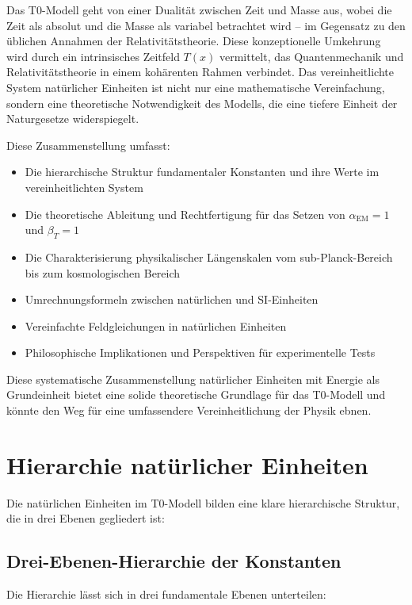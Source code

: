 \documentclass[12pt,a4paper]{article}
\newcommand{\Tfield}{T(x)}
\begin{document}
	Das T0-Modell geht von einer Dualität zwischen Zeit und Masse aus, wobei die Zeit als absolut und die Masse als variabel betrachtet wird – im Gegensatz zu den üblichen Annahmen der Relativitätstheorie. Diese konzeptionelle Umkehrung wird durch ein intrinsisches Zeitfeld $\Tfield$ vermittelt, das Quantenmechanik und Relativitätstheorie in einem kohärenten Rahmen verbindet. Das vereinheitlichte System natürlicher Einheiten ist nicht nur eine mathematische Vereinfachung, sondern eine theoretische Notwendigkeit des Modells, die eine tiefere Einheit der Naturgesetze widerspiegelt.
	
	Diese Zusammenstellung umfasst:
	\begin{itemize}
		\item Die hierarchische Struktur fundamentaler Konstanten und ihre Werte im vereinheitlichten System
		\item Die theoretische Ableitung und Rechtfertigung für das Setzen von $\alpha_{\text{EM}} = 1$ und $\beta_T = 1$
		\item Die Charakterisierung physikalischer Längenskalen vom sub-Planck-Bereich bis zum kosmologischen Bereich
		\item Umrechnungsformeln zwischen natürlichen und SI-Einheiten
		\item Vereinfachte Feldgleichungen in natürlichen Einheiten
		\item Philosophische Implikationen und Perspektiven für experimentelle Tests
	\end{itemize}
	
	Diese systematische Zusammenstellung natürlicher Einheiten mit Energie als Grundeinheit bietet eine solide theoretische Grundlage für das T0-Modell und könnte den Weg für eine umfassendere Vereinheitlichung der Physik ebnen.
	
	\section{Hierarchie natürlicher Einheiten}
	
	Die natürlichen Einheiten im T0-Modell bilden eine klare hierarchische Struktur, die in drei Ebenen gegliedert ist:
	
	\subsection{Drei-Ebenen-Hierarchie der Konstanten}
	
	Die Hierarchie lässt sich in drei fundamentale Ebenen unterteilen:
	
\end{document}
